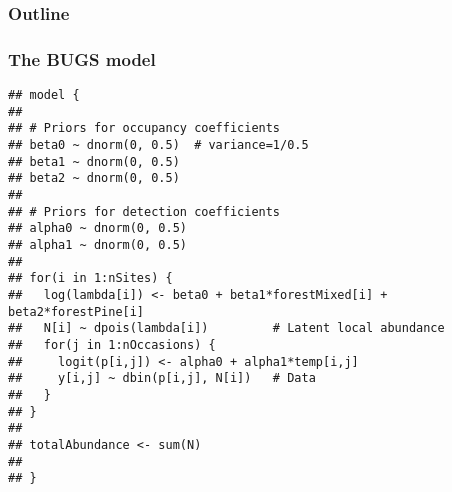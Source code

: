 \documentclass[color=usenames,dvipsnames]{beamer}\usepackage[]{graphicx}\usepackage[]{color}
\makeatletter
\newenvironment{kframe}{%
 \def\at@end@of@kframe{}%
 \ifinner\ifhmode%
  \def\at@end@of@kframe{\end{minipage}}%
  \begin{minipage}{\columnwidth}%
 \fi\fi%
 \def\FrameCommand##1{\hskip\@totalleftmargin \hskip-\fboxsep
 \colorbox{shadecolor}{##1}\hskip-\fboxsep
     \hskip-\linewidth \hskip-\@totalleftmargin \hskip\columnwidth}%
 \MakeFramed {\advance\hsize-\width
   \@totalleftmargin\z@ \linewidth\hsize
   \@setminipage}}%
 {\par\unskip\endMakeFramed%
 \at@end@of@kframe}
\newenvironment{knitrout}{}{} %
\makeatother
\begin{document}
\begin{frame}[plain]
  \frametitle{Outline}
  \Large
\end{frame}




\begin{frame}[fragile]
  \frametitle{The BUGS model}
\begin{knitrout}\scriptsize
{}\color{fgcolor}\begin{kframe}
\begin{verbatim}
## model {
## 
## # Priors for occupancy coefficients
## beta0 ~ dnorm(0, 0.5)  # variance=1/0.5
## beta1 ~ dnorm(0, 0.5)
## beta2 ~ dnorm(0, 0.5)
## 
## # Priors for detection coefficients
## alpha0 ~ dnorm(0, 0.5)  
## alpha1 ~ dnorm(0, 0.5)
## 
## for(i in 1:nSites) {
##   log(lambda[i]) <- beta0 + beta1*forestMixed[i] + beta2*forestPine[i]
##   N[i] ~ dpois(lambda[i])         # Latent local abundance
##   for(j in 1:nOccasions) {
##     logit(p[i,j]) <- alpha0 + alpha1*temp[i,j]
##     y[i,j] ~ dbin(p[i,j], N[i])   # Data
##   }
## }
## 
## totalAbundance <- sum(N)
## 
## }
\end{verbatim}
\end{kframe}
\end{knitrout}

\end{frame}
\end{document}
